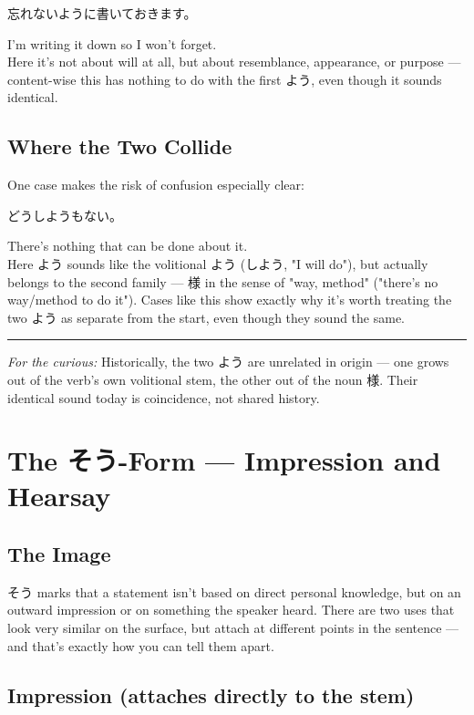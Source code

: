 \documentclass[12pt]{book}
\begin{document}
\par\quad 忘れないように書いておきます。\\
\par\quad I'm writing it down so I won't forget.\\

Here it's not about will at all, but about resemblance, appearance, or purpose — content-wise this has nothing to do with the first よう, even though it sounds identical.

\section*{Where the Two Collide}

One case makes the risk of confusion especially clear:

\par\quad どうしようもない。\\
\par\quad There's nothing that can be done about it.\\

Here よう sounds like the volitional よう (しよう, "I will do"), but actually belongs to the second family — 様 in the sense of "way, method" ("there's no way/method to do it"). Cases like this show exactly why it's worth treating the two よう as separate from the start, even though they sound the same.

\bigskip\hrule\bigskip

\emph{For the curious:} Historically, the two よう are unrelated in origin — one grows out of the verb's own volitional stem, the other out of the noun 様. Their identical sound today is coincidence, not shared history.


\chapter{The そう-Form — Impression and Hearsay}

\section*{The Image}

そう marks that a statement isn't based on direct personal knowledge, but on an outward impression or on something the speaker heard. There are two uses that look very similar on the surface, but attach at different points in the sentence — and that's exactly how you can tell them apart.

\section*{Impression (attaches directly to the stem)}
\end{document}
